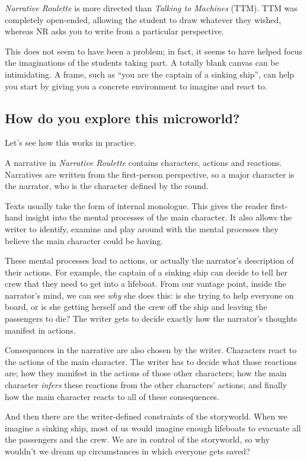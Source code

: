 \emph{Narrative Roulette} is more directed than \emph{Talking to
Machines} (TTM). TTM was completely open-ended, allowing the student to
draw whatever they wished, whereas NR asks you to write from a
particular perspective.

This does not seem to have been a problem; in fact, it seems to have
helped focus the imaginations of the students taking part. A totally
blank canvas can be intimidating. A frame, such as ``you are the captain
of a sinking ship'', can help you start by giving you a concrete
environment to imagine and react to.

\subsection{How do you explore this microworld?}

Let's see how this works in practice.

A narrative in \emph{Narrative Roulette} contains characters, actions
and reactions. Narratives are written from the first-person perspective,
so a major character is the narrator, who is the character defined by
the round.

Texts usually take the form of internal monologue. This gives the reader
first-hand insight into the mental processes of the main character. It
also allows the writer to identify, examine and play around with the
mental processes they believe the main character could be having.

These mental processes lead to actions, or actually the narrator's
description of their actions. For example, the captain of a sinking ship
can decide to tell her crew that they need to get into a lifeboat. From
our vantage point, inside the narrator's mind, we can see \emph{why} she
does this: is she trying to help everyone on board, or is she getting
herself and the crew off the ship and leaving the passengers to die? The
writer gets to decide exactly how the narrator's thoughts manifest in
actions.

Consequences in the narrative are also chosen by the writer. Characters
react to the actions of the main character. The writer has to decide
what those reactions are; how they manifest in the actions of those
other characters; how the main character \emph{infers} these reactions
from the other characters' actions; and finally how the main character
reacts to all of these consequences.

And then there are the writer-defined constraints of the storyworld.
When we imagine a sinking ship, most of us would imagine enough
lifeboats to evacuate all the passengers and the crew. We are in control
of the storyworld, so why wouldn't we dream up circumstances in which
everyone gets saved?

